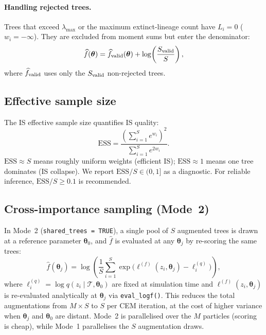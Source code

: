 \documentclass[12pt,a4paper]{article}
\newcommand{\obs}{\mathcal{T}}
\newcommand{\pars}{\bm{\theta}}
\newcommand{\fhat}{\widehat{f}}
\newcommand{\logf}{\ell^{(f)}}
\newcommand{\logq}{\ell^{(q)}}
\newcommand{\lw}{w}
\newcommand{\ESS}{\mathrm{ESS}}
\begin{document}
\paragraph{Handling rejected trees.}
Trees that exceed $\lambda_{\max}$ or the maximum extinct-lineage count
have $L_i = 0$ ($\lw_i = -\infty$). They are excluded from moment sums
but enter the denominator:
\begin{equation}
  \fhat(\pars) = \fhat_{\rm valid}(\pars)
    + \log\!\left(\frac{S_{\rm valid}}{S}\right),
\end{equation}
where $\fhat_{\rm valid}$ uses only the $S_{\rm valid}$ non-rejected trees.

\subsection{Effective sample size}

The IS effective sample size quantifies IS quality:
\begin{equation}\label{eq:ESS}
  \ESS = \frac{\left(\displaystyle\sum_{i=1}^{S} e^{\lw_i}\right)^2}
              {\displaystyle\sum_{i=1}^{S} e^{2\lw_i}}.
\end{equation}
$\ESS \approx S$ means roughly uniform weights (efficient IS); $\ESS\approx 1$
means one tree dominates (IS collapse). We report $\ESS/S\in(0,1]$ as a
diagnostic. For reliable inference, $\ESS/S \geq 0.1$ is recommended.

\subsection{Cross-importance sampling (Mode~2)}\label{sec:crossIS}

In Mode~2 (\texttt{shared\_trees = TRUE}), a single pool of $S$ augmented
trees is drawn at a reference parameter $\pars_0$, and $\fhat$ is evaluated
at any $\pars_j$ by re-scoring the same trees:
\begin{equation}\label{eq:crossIS}
  \fhat(\pars_j) = \log\!\left(\frac{1}{S}\sum_{i=1}^{S}
    \exp\bigl(\logf(z_i,\pars_j) - \logq_i\bigr)\right),
\end{equation}
where $\logq_i = \log q(z_i \mid \obs, \pars_0)$ are fixed at simulation
time and $\logf(z_i,\pars_j)$ is re-evaluated analytically at $\pars_j$
via \texttt{eval\_logf()}. This reduces the total augmentations from
$M \times S$ to $S$ per CEM iteration, at the cost of higher variance when
$\pars_j$ and $\pars_0$ are distant. Mode~2 is parallelised over the $M$
particles (scoring is cheap), while Mode~1 parallelises the $S$
augmentation draws.
\end{document}
